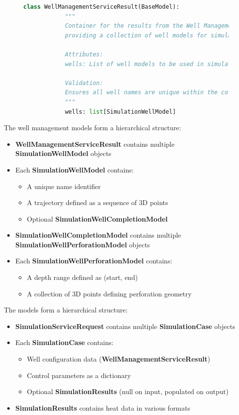 \begin{enumerate}
	\begin{figure}[H]
		\begin{lstlisting}[language=Python, caption={WellManagementServiceResult Model}]
			class WellManagementServiceResult(BaseModel):
			"""
			Container for the results from the Well Management Service,
			providing a collection of well models for simulation.

			Attributes:
			wells: List of well models to be used in simulation

			Validation:
			Ensures all well names are unique within the collection
			"""
			wells: list[SimulationWellModel]
		\end{lstlisting}
	\end{figure}

	The well management models form a hierarchical structure:

	\begin{itemize}
		\item \textbf{WellManagementServiceResult} contains multiple \textbf{SimulationWellModel} objects
		\item Each \textbf{SimulationWellModel} contains:
		\begin{itemize}
			\item A unique name identifier
			\item A trajectory defined as a sequence of 3D points
			\item Optional \textbf{SimulationWellCompletionModel}
		\end{itemize}
		\item \textbf{SimulationWellCompletionModel} contains multiple \textbf{SimulationWellPerforationModel} objects
		\item Each \textbf{SimulationWellPerforationModel} contains:
		\begin{itemize}
			\item A depth range defined as (start, end)
			\item A collection of 3D points defining perforation geometry
		\end{itemize}
	\end{itemize}
\end{enumerate}

\bigskip

The models form a hierarchical structure:

\begin{itemize}
	\item \textbf{SimulationServiceRequest} contains multiple \textbf{SimulationCase} objects
	\item Each \textbf{SimulationCase} contains:
	\begin{itemize}
		\item Well configuration data (\textbf{WellManagementServiceResult})
		\item Control parameters as a dictionary
		\item Optional \textbf{SimulationResults} (null on input, populated on output)
	\end{itemize}
	\item \textbf{SimulationResults} contains heat data in various formats
\end{itemize}




